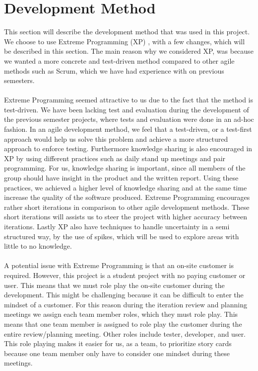 
\section{Development Method}
\label{sec:development_method}

This section will describe the development method that was used in this project. We choose to use Extreme Programming (XP) \parencite{xp}, with a few changes, which will be described in this section. The main reason why we considered XP, was because we wanted a more concrete and test-driven method compared to other agile methods such as Scrum, which we have had experience with on previous semesters.
\\\\
Extreme Programming seemed attractive to us due to the fact that the method is test-driven. We have been lacking test and evaluation during the development of the previous semester projects, where tests and evaluation were done in an ad-hoc fashion. In an agile development method, we feel that a test-driven, or a test-first approach would help us solve this problem and achieve a more structured approach to enforce testing. Furthermore knowledge sharing is also encouraged in XP by using different practices such as daily stand up meetings and pair programming. For us, knowledge sharing is important, since all members of the group should have insight in the product and the written report. Using these practices, we achieved a higher level of knowledge sharing and at the same time increase the quality of the software produced. Extreme Programming encourages rather short iterations in comparison to other agile development methods. These short iterations will assists us to steer the project with higher accuracy between iterations. Lastly XP also have techniques to handle uncertainty in a semi structured way, by the use of spikes, which will be used to explore areas with little to no knowledge. 
\\\\
A potential issue with Extreme Programming is that an on-site customer is required. However, this project is a student project with no paying customer or user. This means that we must role play the on-site customer during the development. This might be challenging because it can be difficult to enter the mindset of a customer. For this reason during the iteration review and planning meetings we assign each team member roles, which they must role play. This means that one team member is assigned to role play the customer during the entire review/planning meeting. Other roles include tester, developer, and user. This role playing makes it easier for us, as a team, to prioritize story cards because one team member only have to consider one mindset during these meetings.
